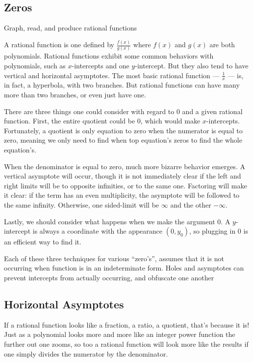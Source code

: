 
\subsection{Zeros}

\begin{objective}
Graph, read, and produce rational functions
\end{objective}

A rational function is one defined by $\frac{f(x)}{g(x)}$ where $f(x)$ and $g(x)$ are both
polynomials.  Rational functions exhibit some common behaviors with polynomials, 
such as $x$-intercepts and one $y$-intercept.  But they also tend to have vertical and
horizontal asymptotes.  The most basic rational function --- $\frac{1}{x}$ --- is, in fact,
a hyperbola, with two branches.  But rational functions can have many more than two
branches, or even just have one.


There are three things one could consider with regard to 0 and a given rational function.
First, the entire quotient could be 0, which would make $x$-intercepts.  Fortunately,
a quotient is only equation to zero when the numerator is equal to zero, meaning
we only need to find when top equation's zeros to find the whole equation's.

When the denominator is equal to zero, much more bizarre behavior emerges.  A vertical
asymptote will occur, though it is not immediately clear if the left and right limits will be
to opposite infinities, or to the same one.  Factoring will make it clear: if the term
has an even multiplicity, the asymptote will be followed to the same infinity.  Otherwise,
one sided-limit will be $\infty$ and the other $-\infty$.

Lastly, we should consider what happens when we make the argument 0.  A $y$-intercept
is always a coordinate with the appearance $(0,y_0)$, so plugging in 0 is an efficient way
to find it.

Each of these three techniques for various ``zero's'', assumes that it is not occurring when
function is in an indeterminate form.  Holes and asymptotes can prevent intercepts from 
actually occurring, and obfuscate one another

\subsection{Horizontal Asymptotes}
If a rational function looks like a fraction, a ratio, a quotient, that's because it is!  Just as
a polynomial looks more and more like an integer power function the further out one zooms,
so too a rational function will look more like the results if one simply divides the numerator
by the denominator.


